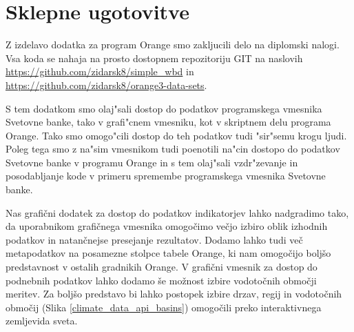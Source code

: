 \chapter{Sklepne ugotovitve}



Z izdelavo dodatka za program Orange smo zakljucili delo na diplomski nalogi.
Vsa koda se nahaja na prosto dostopnem repozitoriju GIT na naslovih
\url{https://github.com/zidarsk8/simple_wbd} in
\url{https://github.com/zidarsk8/orange3-data-sets}.




S tem dodatkom smo olaj"sali dostop do podatkov programskega vmesnika Svetovne 
banke, tako v grafi"cnem vmesniku, kot v skriptnem delu programa Orange. Tako
smo omogo"cili dostop do teh podatkov tudi "sir"semu krogu ljudi. Poleg tega
smo z na"sim vmesnikom tudi poenotili na"cin dostopo do podatkov Svetovne banke
v programu Orange in s tem olaj"sali vzdr"zevanje in posodabljanje kode v
primeru spremembe programskega vmesnika Svetovne banke.



Nas grafični dodatek za dostop do podatkov indikatorjev lahko nadgradimo tako,
da uporabnikom grafičnega vmesnika omogočimo večjo izbiro oblik izhodnih
podatkov in natančnejse presejanje rezultatov. Dodamo lahko tudi več
metapodatkov na posamezne stolpce tabele Orange, ki nam omogočijo boljšo
predstavnost v ostalih gradnikih Orange. V grafični vmesnik za dostop do
podnebnih podatkov lahko dodamo še možnost izbire vodotočnih območji meritev.
Za boljšo predstavo bi lahko postopek izbire drzav, regij in vodotočnih
območij (Slika \ref{climate_data_api_basins}) omogočili preko interaktivnega 
zemljevida sveta.

% 
% 
